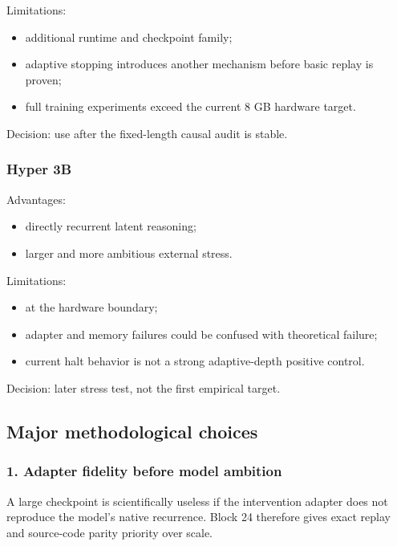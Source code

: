 \documentclass[
  10pt,
]{article}
\providecommand{\tightlist}{%
  \setlength{\itemsep}{0pt}\setlength{\parskip}{0pt}}
\begin{document}
Limitations:

\begin{itemize}
\tightlist
\item
  additional runtime and checkpoint family;
\item
  adaptive stopping introduces another mechanism before basic replay is
  proven;
\item
  full training experiments exceed the current 8 GB hardware target.
\end{itemize}

Decision: use after the fixed-length causal audit is stable.

\subsubsection{Hyper 3B}\label{hyper-3b}

Advantages:

\begin{itemize}
\tightlist
\item
  directly recurrent latent reasoning;
\item
  larger and more ambitious external stress.
\end{itemize}

Limitations:

\begin{itemize}
\tightlist
\item
  at the hardware boundary;
\item
  adapter and memory failures could be confused with theoretical
  failure;
\item
  current halt behavior is not a strong adaptive-depth positive control.
\end{itemize}

Decision: later stress test, not the first empirical target.

\subsection{Major methodological
choices}\label{major-methodological-choices}

\subsubsection{1. Adapter fidelity before model
ambition}\label{adapter-fidelity-before-model-ambition}

A large checkpoint is scientifically useless if the intervention adapter
does not reproduce the model's native recurrence. Block 24 therefore
gives exact replay and source-code parity priority over scale.
\end{document}
